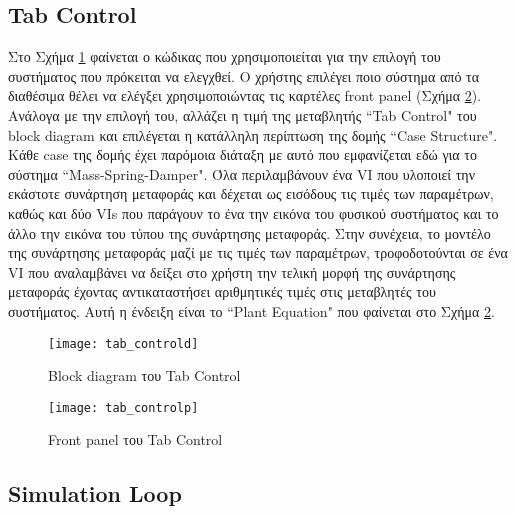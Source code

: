 \subsection{Tab Control}

Στο Σχήμα \ref{fig:tab_controld} φαίνεται ο κώδικας που χρησιμοποιείται για την επιλογή του συστήματος που πρόκειται να ελεγχθεί. Ο χρήστης επιλέγει ποιο σύστημα από τα διαθέσιμα θέλει να ελέγξει χρησιμοποιώντας τις καρτέλες front panel (Σχήμα \ref{fig:tab_controlp}). Ανάλογα με την επιλογή του, αλλάζει η τιμή της μεταβλητής ``Tab Control" του block diagram και επιλέγεται η κατάλληλη περίπτωση της δομής ``Case Structure". Κάθε case της δομής έχει παρόμοια διάταξη με αυτό που εμφανίζεται εδώ για το σύστημα ``Mass-Spring-Damper". Όλα περιλαμβάνουν ένα VI που υλοποιεί την εκάστοτε συνάρτηση μεταφοράς και δέχεται ως εισόδους τις τιμές των παραμέτρων, καθώς και δύο VIs που παράγουν το ένα την εικόνα του φυσικού συστήματος και το άλλο την εικόνα του τύπου της συνάρτησης μεταφοράς. Στην συνέχεια, το μοντέλο της συνάρτησης μεταφοράς μαζί με τις τιμές των παραμέτρων, τροφοδοτούνται σε ένα VI που αναλαμβάνει να δείξει στο χρήστη την τελική μορφή της συνάρτησης μεταφοράς έχοντας αντικαταστήσει αριθμητικές τιμές στις μεταβλητές του συστήματος. Αυτή η ένδειξη είναι το ``Plant Equation" που φαίνεται στο Σχήμα \ref{fig:tab_controlp}.

\begin{figure}[h]
  \centering
  \texttt{[image: tab\_controld]}
  \caption{Block diagram του Tab Control}
  \label{fig:tab_controld}
\end{figure}

\begin{figure}[h]
  \centering
  \texttt{[image: tab\_controlp]}
  \caption{Front panel του Tab Control}
  \label{fig:tab_controlp}
\end{figure}

\subsection{Simulation Loop}

